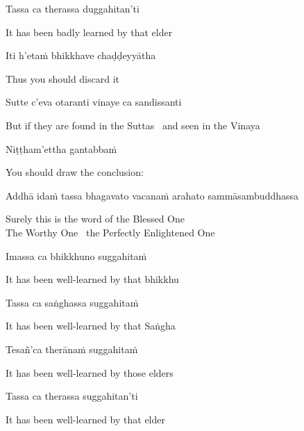 Tassa ca therassa duggahitan'ti

\begin{english}
  It has been badly learned by that elder
\end{english}

Iti h'etaṁ bhikkhave chaḍḍeyyātha

\begin{english}
  Thus you should discard it
\end{english}

\ifbfiveversion\clearpage\fi

Sutte c'eva otaranti vinaye ca sandissanti

\begin{english}
  But if they are found in the Suttas \breathmark\ and seen in the Vinaya
\end{english}

Niṭṭham'ettha gantabbaṁ

\begin{english}
  You should draw the conclusion:
\end{english}

\begin{pali-hang}
  Addhā idaṁ tassa bhagavato vacanaṁ arahato sammāsambuddhassa
\end{pali-hang}

\begin{english}
  Surely this is the word of the Blessed One\\
  The Worthy One \breathmark\ the Perfectly Enlightened One
\end{english}

Imassa ca bhikkhuno suggahitaṁ

\begin{english}
  It has been well-learned by that bhikkhu
\end{english}

Tassa ca saṅghassa suggahitaṁ

\begin{english}
  It has been well-learned by that Saṅgha
\end{english}

Tesañ'ca therānaṁ suggahitaṁ

\begin{english}
  It has been well-learned by those elders
\end{english}

Tassa ca therassa suggahitan'ti

\begin{english}
  It has been well-learned by that elder
\end{english}

